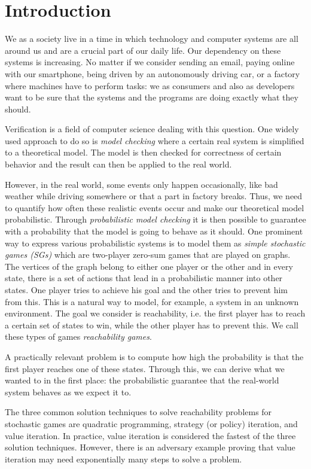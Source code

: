 \chapter{Introduction} \label{ch:intro}

We as a society live in a time in which technology and computer systems are all around us and are a crucial part of our daily life. 
Our dependency on these systems is increasing. 
No matter if we consider sending an email, paying online with our smartphone, being driven by an autonomously driving car, or a factory where machines have to perform tasks: 
we as consumers and also as developers want to be sure that the systems and the programs are doing exactly what they should.

Verification is a field of computer science dealing with this question. 
One widely used approach to do so is \emph{model checking} where a certain real system is simplified to a theoretical model. 
The model is then checked for correctness of certain behavior and the result can then be applied to the real world.

However, in the real world, some events only happen occasionally, like bad weather while driving somewhere or that a part in factory breaks. 
Thus, we need to quantify how often these realistic events occur and make our theoretical model probabilistic. 
Through \emph{probabilistic model checking} it is then possible to guarantee with a probability that the model is going to behave as it should. 
One prominent way to express various probabilistic systems is to model them as \emph{simple stochastic games (SGs)} which are two-player zero-sum games that are played on graphs. 
The vertices of the graph belong to either one player or the other and in every state, there is a set of actions that lead in a probabilistic manner into other states. 
One player tries to achieve his goal and the other tries to prevent him from this. This is a natural way to model, for example, a system in an unknown environment.
The goal we consider is reachability, i.e. the first player has to reach a certain set of states to win, while the other player has to prevent this. 
We call these types of games \emph{reachability games}.

A practically relevant problem is to compute how high the probability is that the first player reaches one of these states. 
Through this, we can derive what we wanted to in the first place: 
the probabilistic guarantee that the real-world system behaves as we expect it to.

The three common solution techniques to solve reachability problems for stochastic games are quadratic programming, strategy (or policy) iteration, and value iteration.
In practice, value iteration is considered the fastest of the three solution techniques.
However, there is an adversary example \cite{haddadmonmege} proving that value iteration may need exponentially many steps to solve a problem.


